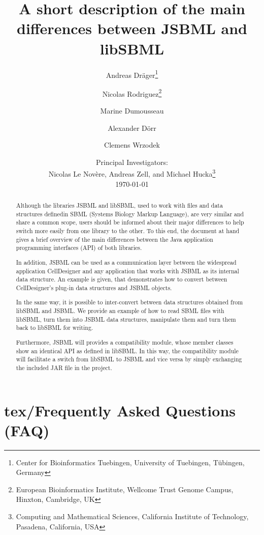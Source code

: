 \documentclass[
  BCOR12mm,
  letterpaper,
  11pt,
  headsepline,
  pointlessnumbers,
  tablecaptionabove,
  onelinecaption,
  headinclude,
  appendixprefix,
  twoside,
  titlepage
]{scrartcl}
\title{A short description of the main differences between JSBML and libSBML}
\author{Andreas Dr\"ager\thanks{Center for Bioinformatics Tuebingen, University
of Tuebingen, T\"ubingen, Germany}\and%
Nicolas Rodriguez\thanks{European Bioinformatics Institute, Wellcome Trust
Genome Campus, Hinxton, Cambridge, UK}\and%
Marine Dumousseau\footnotemark[2]\and%
Alexander D\"orr\footnotemark[1]\and%
Clemens Wrzodek\footnotemark[1]}
\date{Principal Investigators:\\
Nicolas Le Nov{\`e}re\footnotemark[2], Andreas Zell\footnotemark[1], and Michael
Hucka\thanks{Computing and Mathematical Sciences, California Institute of
Technology, Pasadena, California, USA}\\[4ex]
\today}
\begin{document}
\maketitle

\begin{abstract}
Although the libraries JSBML and libSBML, used to work with files and data
structures definedin SBML (Systems Biology Markup Language), are
very similar and share a common scope, users should be informed about their
major differences to help switch more easily from one library to the other. To
this end, the document at hand gives a brief overview of the main differences
between the Java\texttrademark{} application programming interfaces (API) of
both libraries.

In addition, JSBML can be used as a communication layer between the widespread
application CellDesigner and any application that works with JSBML as its
internal data structure. An example is given, that demonstrates how to
convert between CellDesigner's plug-in data structures and JSBML objects.

In the same way, it is possible to inter-convert between data structures
obtained from libSBML and JSBML. We provide an example of how to read SBML files
with libSBML, turn them into JSBML data structures, manipulate them and turn
them back to libSBML for writing.

Furthermore, JSBML will provides a compatibility module, whose member classes
show an identical API as defined in libSBML. In this way, the
compatibility module will facilitate a switch from libSBML to JSBML and vice
versa by simply exchanging the included JAR file in the project.


\end{abstract}

\tableofcontents


\appendix

\section{tex/Frequently Asked Questions (FAQ)}





\printindex
\end{document}
